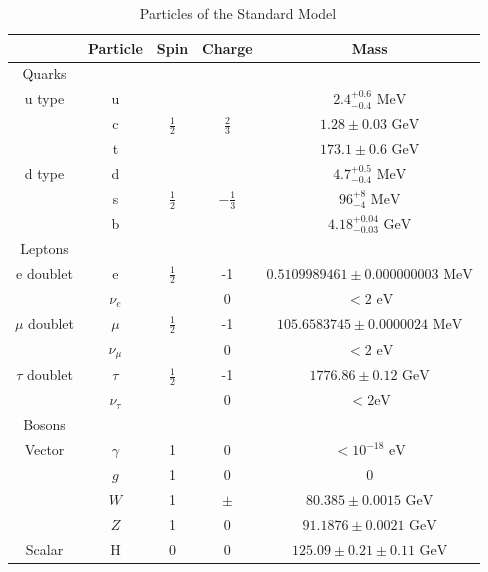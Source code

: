 \begin{table}[h]
\begin{center}
\footnotesize
\begin{tabular}[h]{|c||c|c|c|c|}
\hline
 & Particle & Spin & Charge & Mass \\
\hline\hline
Quarks &&&&\\
\hline
u type &u& & &${2.4^{+0.6}_{-0.4} \text{ MeV}}$\\
 &c&${\frac{1}{2}}$&${\frac{2}{3}}$&${1.28\pm{0.03} \text{ GeV}}$\\
 &t& & &${173.1\pm{0.6} \text{ GeV}}$\\
\hline
d type & d& & & ${4.7^{+0.5}_{-0.4} \text{ MeV}}$\\
 & s & ${\frac{1}{2}}$ & ${-\frac{1}{3}}$ & ${96^{+8}_{-4} \text{ MeV}}$\\
 & b & & & ${4.18^{+0.04}_{-0.03} \text{ GeV}}$\\
\hline\hline
Leptons &&&&\\
\hline
e doublet & e & ${\frac{1}{2}}$ & -1 &${0.5109989461\pm{}0.000000003 \text{ MeV}}$\\
 & ${\nu_{e}}$ & & 0 & ${< 2 \text{ eV}}$\\
 \hline
${\mu}$ doublet & ${\mu}$ & ${\frac{1}{2}}$ & -1 &${105.6583745\pm{}0.0000024 \text{ MeV}}$\\
 & ${\nu_{\mu}}$ & & 0 & ${< 2 \text{ eV}}$\\
 \hline
${\tau}$ doublet & ${\tau}$ & ${\frac{1}{2}}$ & -1 &${1776.86\pm{}0.12 \text{ GeV}}$\\
 & ${\nu_{\tau}}$ & & 0 & ${< 2 \text{eV}}$\\
 \hline\hline
 Bosons &&&&\\
 \hline
 Vector & ${\gamma}$ & 1 & 0 & ${< 10^{-18} \text{ eV}}$\\
 & ${g}$ & 1 & 0 & ${0}$\\
 & ${W}$ & 1 & ${\pm}$ & ${80.385\pm{}0.0015 \text{ GeV}}$\\
 & ${Z}$ & 1 & 0 & ${91.1876\pm{}0.0021 \text{ GeV}}$\\
 \hline
 Scalar & H & 0& 0 & ${125.09\pm{}0.21\pm{}0.11 \text{ GeV}}$\\
 \hline
\end{tabular}
\caption[Particles of the Standard Model]{Particles of the Standard Model ~\cite{PDG2018}}
\label{tab:SM}
\end{center}
\end{table}


